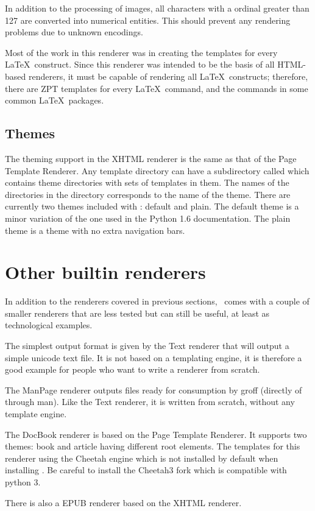In addition to the processing of images, all characters with a ordinal
greater than 127 are converted into numerical entities.  This should
prevent any rendering problems due to unknown encodings.

Most of the work in this renderer was in creating the templates for
every \LaTeX\ construct.  Since this renderer was intended to be the
basis of all HTML-based renderers, it must be capable of rendering
all \LaTeX\ constructs; therefore, there are ZPT templates for every
\LaTeX\ command, and the commands in some common \LaTeX\ packages.

\subsection{Themes}

The theming support in the XHTML renderer is the same as that of the
Page Template Renderer.  Any template directory can have a subdirectory called
 which contains theme directories with sets of templates
in them.  The names of the directories in the  directory
corresponds to the name of the theme.  There are currently two themes
included with \plasTeX: default and plain.  The default theme is a
minor variation of the one used in the Python 1.6 documentation.  The
plain theme is a theme with no extra navigation bars.

\section{Other builtin renderers}

In addition to the renderers covered in previous sections, \plasTeX\ 
comes with a couple of smaller renderers that are less tested but can
still be useful, at least as technological examples.

The simplest output format is given by the Text renderer that will
output a simple unicode text file. It is not based on a templating
engine, it is therefore a good example for people who want to write 
a renderer from scratch.

The ManPage renderer outputs files ready for consumption by groff 
(directly of through man). Like the Text renderer, it is written 
from scratch, without any template engine.

The DocBook renderer is based on the Page Template Renderer.
It supports two themes: book and article having different root elements.
The templates for this renderer using the Cheetah engine which is not 
installed by default when installing \plasTeX. Be careful to install
the Cheetah3 fork which is compatible with python 3.    

There is also a EPUB renderer based on the XHTML renderer.
